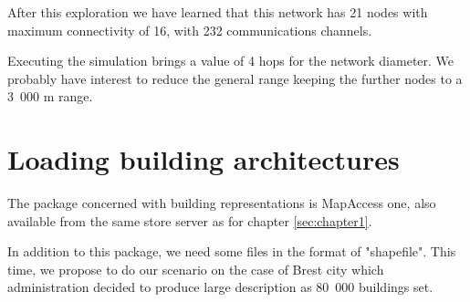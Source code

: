 After this exploration we have learned that this network has 21 nodes with maximum 
connectivity of 16, with 232 communications channels.

Executing the simulation brings a value of 4 hops for the network diameter. 
We probably have interest to reduce the general range keeping the further nodes to 
a 3~000 m range. 

\section{Loading building architectures}

The package concerned with building representations is MapAccess one, also available from 
the same store server as for chapter \ref{sec:chapter1}. 

In addition to this package, we need some files in the format of "shapefile". This time, 
we propose to do our scenario on the case of Brest city which administration decided 
to produce large description as 80~000 buildings set. 

